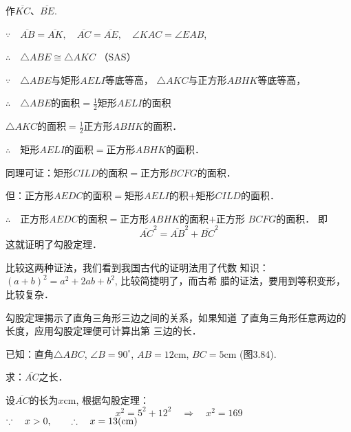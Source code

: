 作$\overline{KC}$、$\overline{BE}$.

$\because\quad \overline{AB}=\overline{AK},\quad \overline{AC}=\overline{AE},\quad \angle KAC=\angle EAB$,

$\therefore\quad \triangle ABE\cong \triangle AKC$ （SAS）

$\because\quad \triangle ABE$与矩形$AELI$等底等高，
$\triangle AKC$与正方形$ABHK$等底等高，

$\therefore\quad \triangle ABE$的面积$=\frac{1}{2}$矩形$AELI$的面积

$\triangle AKC$的面积$=\frac{1}{2}$正方形$ABHK$的面积．

$\therefore\quad $矩形$AELI$的面积$=$正方形$ABHK$的面积．

同理可证：矩形$CILD$的面积$=$正方形$BCFG$的面积．

但：正方形$AEDC$的面积$=$矩形$AELI$的积$+$矩形$CILD$的面积．

$\therefore\quad $正方形$AEDC$的面积$=$正方形$ABHK$的面积$+$正方形
$BCFG$的面积．
即
\[\overline{AC}^2=\overline{AB}^2+\overline{BC}^2\]
这就证明了勾股定理．

比较这两种证法，我们看到我国古代的证明法用了代数
知识：$(a+b)^2=a^2+2ab+b^2$, 比较简捷明了，而古希
腊的证法，要用到等积变形，比较复杂．

勾股定理揭示了直角三角形三边之间的关系，如果知道
了直角三角形任意两边的长度，应用勾股定理便可计算出第
三边的长．

\begin{example}
    已知：直角$\triangle ABC$, $\angle B=90^{\circ}$, $AB=12$cm,
$BC=5$cm (图3.84).

求：$\overline{AC}$之长．
\end{example}


\begin{solution}
    设$\overline{AC}$的长为$x$cm, 根据勾股定理：
\[x^2=5^2+12^2\quad \Rightarrow\quad x^2=169\]
$\because\quad x>0,\qquad \therefore\quad x=13({\rm cm})$
\end{solution}

\begin{figure}[htp]\centering
    \begin{minipage}[t]{0.48\textwidth}
    \centering
{}
    \caption{}
    \end{minipage}
    \begin{minipage}[t]{0.48\textwidth}
    \centering
    \caption{}
    \end{minipage}
    \end{figure}

